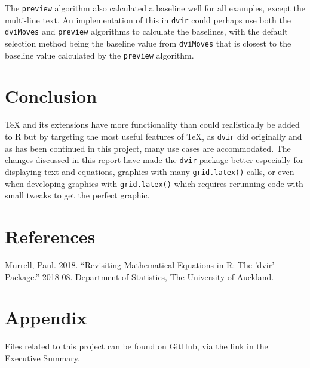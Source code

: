 \documentclass[]{article}
\begin{document}
The \texttt{preview} algorithm also calculated a baseline well for all
examples, except the multi-line text. An implementation of this in
\texttt{dvir} could perhaps use both the \texttt{dviMoves} and
\texttt{preview} algorithms to calculate the baselines, with the default
selection method being the baseline value from \texttt{dviMoves} that is
closest to the baseline value calculated by the \texttt{preview}
algorithm.

\newpage{}

\section{Conclusion}\label{conclusion}

\TeX{} and its extensions have more functionality than could
realistically be added to R but by targeting the most useful features of
\TeX{}, as \texttt{dvir} did originally and as has been continued in
this project, many use cases are accommodated. The changes discussed in
this report have made the \texttt{dvir} package better especially for
displaying text and equations, graphics with many \texttt{grid.latex()}
calls, or even when developing graphics with \texttt{grid.latex()} which
requires rerunning code with small tweaks to get the perfect graphic.

\newpage{}

\section{References}\label{references}

\hypertarget{refs}{}
\hypertarget{ref-murrell-dvir}{}
Murrell, Paul. 2018. ``Revisiting Mathematical Equations in R: The
'dvir' Package.'' 2018-08. Department of Statistics, The University of
Auckland.

\newpage{}

\section{Appendix}\label{appendix}

Files related to this project can be found on GitHub, via the link in
the Executive Summary.
\end{document}
